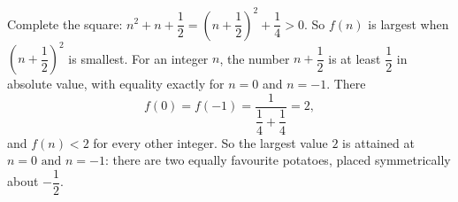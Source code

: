 Complete the square: $n^2+n+\dfrac{1}{2}=\left(n+\dfrac{1}{2}\right)^2+\dfrac{1}{4}>0$. So $f(n)$ is largest when $\left(n+\dfrac{1}{2}\right)^2$ is smallest. For an integer $n$, the number $n+\dfrac{1}{2}$ is at least $\dfrac{1}{2}$ in absolute value, with equality exactly for $n=0$ and $n=-1$. There
\[
f(0)=f(-1)=\dfrac{1}{\dfrac{1}{4}+\dfrac{1}{4}}=2,
\]
and $f(n)<2$ for every other integer. So the largest value $\boxed{2}$ is attained at $\boxed{n=0\text{ and }n=-1}$: there are two equally favourite potatoes, placed symmetrically about $-\dfrac{1}{2}$.
